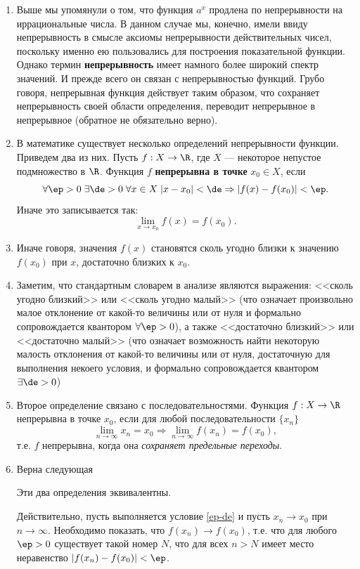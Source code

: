 \begin{enumerate}
\item Выше мы упомянули о том, что функция $a^x$ продлена по непрерывности на иррациональные числа. В данном случае мы, конечно, имели ввиду непрерывность в смысле аксиомы непрерывности действительных чисел, поскольку именно ею пользовались для построения показательной функции. Однако термин \textbf{непрерывность} имеет намного более широкий спектр значений. И прежде всего он связан с непрерывностью функций. Грубо говоря, непрерывная функция действует таким образом, что сохраняет непрерывность своей области определения, переводит непрерывное в непрерывное (обратное не обязательно верно).
\item В математике существует несколько определений непрерывности функции. Приведем два из них. Пусть $f:X\to\R$, где $X$ --- некоторое непустое подмножество в $\R$. Функция $f$ \textbf{непрерывна в точке} $x_0\in X$, если
\begin{equation}\label{ep-de}
\forall\ep>0 \; \exists\de>0\;\forall x\in X\;|x-x_0|<\de\Rightarrow |f(x)-f(x_0)|<\ep.
\end{equation}
Иначе это записывается так:
$$
\lim_{x\to x_0}f(x)=f(x_0).
$$

\item Иначе говоря, значения $f(x)$ становятся сколь угодно близки к значению $f(x_0)$ при $x$, достаточно близких к $x_0$.
\item Заметим, что стандартным словарем в анализе являются выражения: <<сколь угодно близкий>> или <<сколь угодно малый>> (что означает произвольно малое отклонение от какой-то величины или от нуля и формально сопровождается квантором $\forall\ep>0$), а также <<достаточно близкий>> или <<достаточно малый>> (что означает возможность найти некоторую малость отклонения от какой-то величины или от нуля, достаточную для выполнения некоего условия, и формально сопровождается квантором $\exists\de>0$)
\item Второе определение связано с последовательностями. Функция $f:X\to\R$ непрерывна в точке $x_0$, если для любой последовательности $\{x_n\}$ 
\begin{equation}\label{seq}
\lim_{n\to\infty}x_n=x_0\Rightarrow \lim_{n\to\infty}f(x_n)=f(x_0),
\end{equation}
т.е. $f$ непрерывна, когда она \textit{сохраняет предельные переходы}.
\item Верна следующая
\begin{thrm}Эти два определения эквивалентны.\end{thrm}
\pf
Действительно, пусть выполняется условие \eqref{ep-de} и пусть $x_n\to x_0$ при $n\to\infty$. Необходимо показать, что $f(x_n)\to f(x_0)$, т.е. что для любого $\ep>0$ существует такой номер $N$, что для всех $n>N$ имеет место неравенство $|f(x_n)-f(x_0)|<\ep$.


\end{enumerate}
